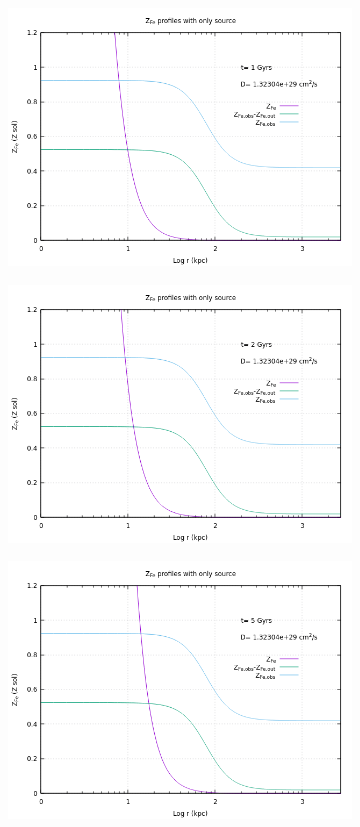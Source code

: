 \documentclass{article}
\begin{document}
\begin{figure}[H]
	\begin{subfigure}{0.50\textwidth}
		\includegraphics[width=0.9\linewidth]{Z_source_1.png}
	\end{subfigure}
	\begin{subfigure}{0.49\textwidth}
		\includegraphics[width=0.9\linewidth]{Z_source_2.png}
	\end{subfigure}
	\begin{subfigure}{0.49\textwidth}
		\includegraphics[width=0.9\linewidth]{Z_source_5.png}

\end{subfigure}
\end{figure}
\end{document}
